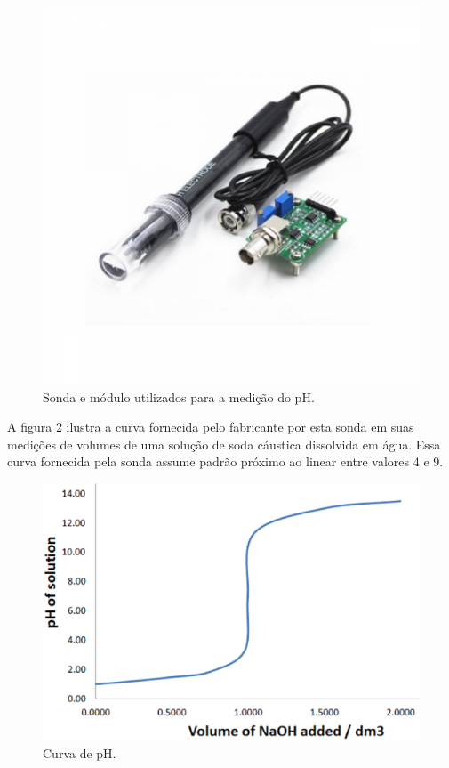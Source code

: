 \begin{figure}[h]
	\centering
	\includegraphics[keepaspectratio=true,scale=0.35]{figuras/sonda_pH}
	\caption{Sonda e módulo utilizados para a medição do pH.}
	\label{sonda_pH}
\end{figure}

A figura \ref{pH_curve} ilustra a curva fornecida pelo fabricante por esta sonda em suas medições de volumes de uma solução de soda cáustica dissolvida em água. Essa curva fornecida pela sonda assume padrão próximo ao linear entre valores 4 e 9.

\begin{figure}[h]
	\centering
	\includegraphics[keepaspectratio=true,scale=0.7]{figuras/pH_curve}
	\caption{Curva de pH.}
	\label{pH_curve}
\end{figure}

